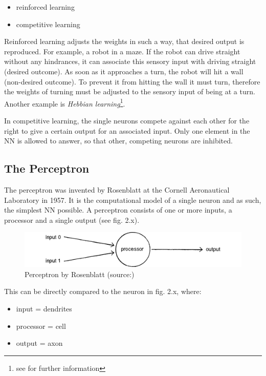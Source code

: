 \begin{itemize}
	\item reinforced learning
	\item competitive learning
\end{itemize}

Reinforced learning adjusts the weights in such a way, that desired output is reproduced. For example, a robot in a maze. If the robot can drive straight without any hindrances, it can associate this sensory input with driving straight (desired outcome). As soon as it approaches a turn, the robot will hit a wall (non-desired outcome). To prevent it from hitting the wall it must turn, therefore the weights of turning must be adjusted to the sensory input of being at a turn. Another example is \emph{Hebbian learning}\footnote{see \cite{Rojas96} for further information}\cite{Rojas96}.

In competitive learning, the single neurons compete against each other for the right to give a certain output for an associated input. Only one element in the NN is allowed to answer, so that other, competing neurons are inhibited\cite{Rojas96}.


\subsection{The Perceptron}
The perceptron was invented by Rosenblatt at the Cornell Aeronautical Laboratory in 1957\cite{Rosenblatt58}. It is the computational model of a single neuron and as such, the simplest NN possible\cite{Shiffman12}. A perceptron consists of one or more inputs, a processor and a single output (see fig. 2.x)\cite{Rosenblatt58}.

\begin{figure}[H]
	\begin{center}
		\includegraphics[scale=0.7]{img/perceptron.png}
		\caption{Perceptron by Rosenblatt (source:\cite{Shiffman12})}
		\label{fig:fig2.5}
	\end{center}
\end{figure}

This can be directly compared to the neuron in fig. 2.x, where:
\begin{itemize}
	\item input = dendrites
	\item processor = cell
	\item output = axon
\end{itemize}

